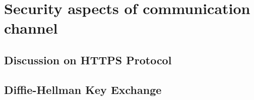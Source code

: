 \chapter{Security aspects of communication channel}\label{ch:security-aspects-of-communication-channel}


\section{Discussion on HTTPS Protocol}\label{sec:discussion-on-https-protocol}



\section{Diffie-Hellman Key Exchange}\label{sec:diffie-hellman-key-exchange}
